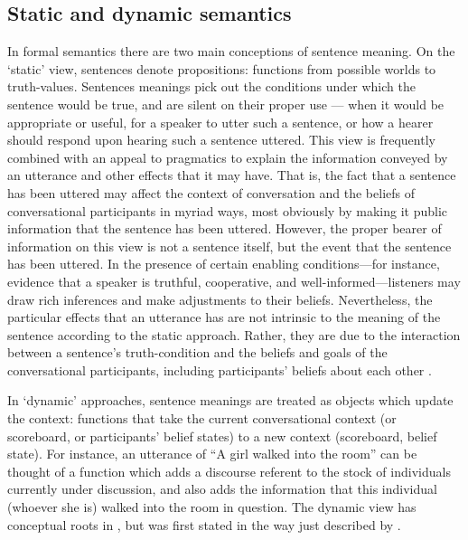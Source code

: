 \documentclass[12pt]{article}
\begin{document}

\subsection{Static and dynamic semantics}
In formal semantics there are two main conceptions of sentence meaning. On the `static' view, sentences denote propositions: functions from possible worlds to truth-values. Sentences meanings pick out the conditions under which the sentence would be true, and are silent on their proper use --- when it would be appropriate or useful, for a speaker to utter such a sentence, or how a hearer should respond upon hearing such a sentence uttered. This view is frequently combined with an appeal to pragmatics to explain the information conveyed by an utterance and other effects that it may have. That is, the fact that a sentence has been uttered may affect the context of conversation and the beliefs of conversational participants in myriad ways, most obviously by making it public information that the sentence has been uttered. However, the proper bearer of information on this view is not a sentence itself, but the event that the sentence has been uttered. In the presence of certain enabling conditions---for instance, evidence that a speaker is truthful, cooperative, and well-informed---listeners may draw rich inferences and make adjustments to their beliefs. Nevertheless, the particular effects that an utterance has are not intrinsic to the meaning of the sentence according to the static approach. Rather, they are due to the interaction between a sentence's truth-condition and the beliefs and goals of the conversational participants, including participants' beliefs about each other \citep[cf.]{grice89,stalnaker78,stalnaker02,clark96}.

In `dynamic' approaches, sentence meanings are treated as objects which update the context: functions that take the current conversational context (or scoreboard, or participants' belief states) to a new context (scoreboard, belief state). For instance, an utterance of ``A girl walked into the room'' can be thought of a function which adds a discourse referent to the stock of individuals currently under discussion, and also adds the information that this individual (whoever she is) walked into the room in question. The dynamic view has conceptual roots in \citet{karttunen69,stalnaker78,lewis79}, but was first stated in the way just described by \citet{heim82,kamp82}. 
\end{document}
